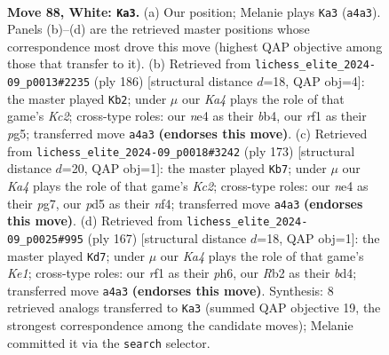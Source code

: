 \documentclass[11pt]{article}
\begin{document}
\clearpage

\begin{figure}[p]\centering
\begin{subfigure}{0.46\textwidth}\centering
\resizebox{\linewidth}{!}{%
\newchessgame
\chessboard[
  setfen={8/8/4k2p/3pp3/K3n2b/8/1R6/5r2 w - - 0 88},
  showmover=false,
  pgfstyle=straightmove, color=movearrow, markmove={a4-a3}
]}
\caption{}
\end{subfigure}\hfill
\begin{subfigure}{0.46\textwidth}\centering
\resizebox{\linewidth}{!}{%
\newchessgame
\chessboard[
  setfen={8/7p/1k6/pp4p1/1b6/8/2K5/8 w - - 50 94},
  showmover=false,
  pgfstyle=straightmove, color=movearrow, markmove={c2-b2}
]}
\caption{}
\end{subfigure}
\\[4pt]
\begin{subfigure}{0.46\textwidth}\centering
\resizebox{\linewidth}{!}{%
\newchessgame
\chessboard[
  setfen={7R/2k3P1/8/8/5N2/5K2/4P3/8 b - - 2 87},
  showmover=false,
  pgfstyle=straightmove, color=movearrow, markmove={c7-b7}
]}
\caption{}
\end{subfigure}\hfill
\begin{subfigure}{0.46\textwidth}\centering
\resizebox{\linewidth}{!}{%
\newchessgame
\chessboard[
  setfen={4k3/8/6PP/5K2/3B2P1/8/8/8 b - - 0 84},
  showmover=false,
  pgfstyle=straightmove, color=movearrow, markmove={e8-d7}
]}
\caption{}
\end{subfigure}
\caption{\textbf{Move 88, White: \texttt{Ka3}.} (a) Our position; Melanie plays \texttt{Ka3} (\texttt{a4a3}). Panels (b)--(d) are the retrieved master positions whose correspondence most drove this move (highest QAP objective among those that transfer to it). (b) Retrieved from \texttt{lichess\_elite\_2024-09\_p0013\#2235} (ply 186) [structural distance $d$=18, QAP obj=4]: the master played \texttt{Kb2}; under $\mu$ our \emph{Ka4} plays the role of that game's \emph{Kc2}; cross-type roles: our \emph{n}e4 as their \emph{b}b4, our \emph{r}f1 as their \emph{p}g5; transferred move \texttt{a4a3} \textbf{(endorses this move)}. (c) Retrieved from \texttt{lichess\_elite\_2024-09\_p0018\#3242} (ply 173) [structural distance $d$=20, QAP obj=1]: the master played \texttt{Kb7}; under $\mu$ our \emph{Ka4} plays the role of that game's \emph{Kc2}; cross-type roles: our \emph{n}e4 as their \emph{p}g7, our \emph{p}d5 as their \emph{n}f4; transferred move \texttt{a4a3} \textbf{(endorses this move)}. (d) Retrieved from \texttt{lichess\_elite\_2024-09\_p0025\#995} (ply 167) [structural distance $d$=18, QAP obj=1]: the master played \texttt{Kd7}; under $\mu$ our \emph{Ka4} plays the role of that game's \emph{Ke1}; cross-type roles: our \emph{r}f1 as their \emph{p}h6, our \emph{R}b2 as their \emph{b}d4; transferred move \texttt{a4a3} \textbf{(endorses this move)}. Synthesis: 8 retrieved analogs transferred to \texttt{Ka3} (summed QAP objective 19, the strongest correspondence among the candidate moves); Melanie committed it via the \texttt{search} selector.}
\label{fig:thought-m174}
\end{figure}
\end{document}
